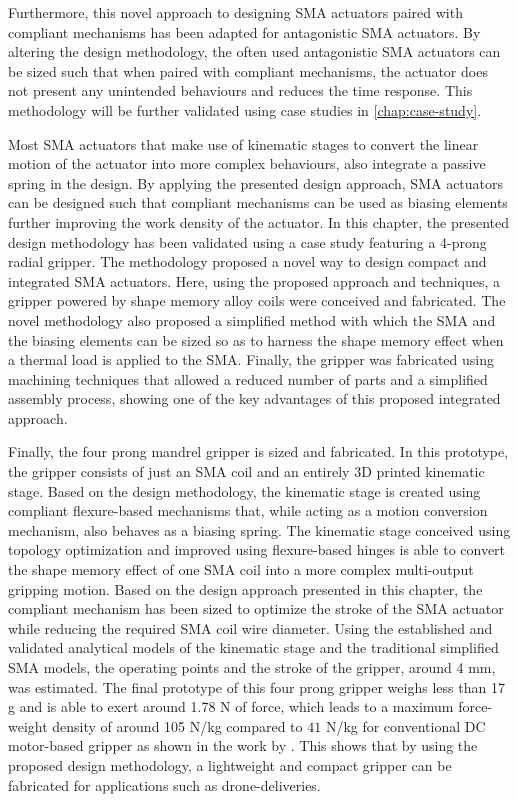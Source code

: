 Furthermore, this novel approach to designing SMA actuators paired with compliant mechanisms has been adapted for antagonistic SMA actuators. By altering the design methodology, the often used antagonistic SMA actuators can be sized such that when paired with compliant mechanisms, the actuator does not present any unintended behaviours and reduces the time response. This methodology will be further validated using case studies in \cref{chap:case-study}.

Most SMA actuators that make use of kinematic stages to convert the linear motion of the actuator into more complex behaviours, also integrate a passive spring in the design. By applying the presented design approach, SMA actuators can be designed such that compliant mechanisms can be used as biasing elements further improving the work density of the actuator. In this chapter, the presented design methodology has been validated using a case study featuring a 4-prong radial gripper. The methodology proposed a novel way to design compact and integrated SMA actuators. Here, using the proposed approach and techniques, a gripper powered by shape memory alloy coils were conceived and fabricated. The novel methodology also proposed a simplified method with which the SMA and the biasing elements can be sized so as to harness the shape memory effect when a thermal load is applied to the SMA. Finally, the gripper was fabricated using machining techniques that allowed a reduced number of parts and a simplified assembly process, showing one of the key advantages of this proposed integrated approach.

Finally, the four prong mandrel gripper is sized and fabricated. In this prototype, the gripper consists of just an SMA coil and an entirely 3D printed kinematic stage. Based on the design methodology, the kinematic stage is created using compliant flexure-based mechanisms that, while acting as a motion conversion mechanism, also behaves as a biasing spring. The kinematic stage conceived using topology optimization and improved using flexure-based hinges is able to convert the shape memory effect of one SMA coil into a more complex multi-output gripping motion. Based on the design approach presented in this chapter, the compliant mechanism has been sized to optimize the stroke of the SMA actuator while reducing the required SMA coil wire diameter. Using the established and validated analytical models of the kinematic stage and the traditional simplified SMA models, the operating points and the stroke of the gripper, around 4 mm, was estimated. The final prototype of this four prong gripper weighs less than 17 g and is able to exert around 1.78 N of force, which leads to a maximum force-weight density of around 105 N/kg compared to $41$ N/kg for conventional DC motor-based gripper as shown in the work by \cite{leeClosedStructureCompliantGripper2021}. This shows that by using the proposed design methodology, a lightweight and compact gripper can be fabricated for applications such as drone-deliveries.


